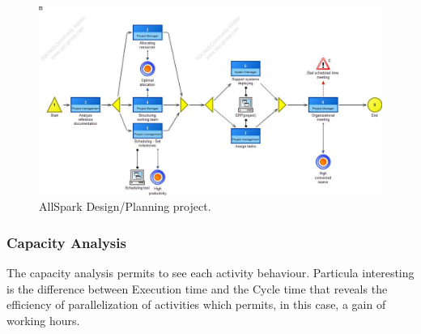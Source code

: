 \begin{figure}[ht!]
\begin{centering}
\includegraphics[scale=0.50, angle=90]{assign2/adonis/imgs/design.jpg}
\caption{AllSpark Design/Planning project.}
\label{2img:desing}
\end{centering}
\end{figure}


\subsubsection{Capacity Analysis}
The capacity analysis permits to see each activity behaviour. Particula interesting is the difference between Execution time and the Cycle time that reveals the efficiency of parallelization of activities which permits, in this case, a gain of working hours.

